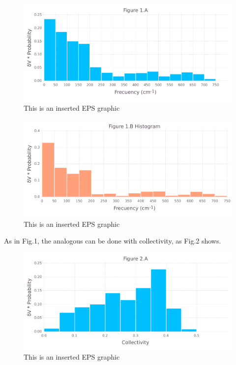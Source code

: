 \documentclass[10pt,letterpaper]{article}
\begin{document}
\begin{figure}[ht]
\begin{center}
\includegraphics[scale=0.5]{1hvr_apo/1afigure.pdf}
\caption{This is an inserted EPS graphic}
\label{fig1}
\end{center}
\end{figure}

\begin{figure}[ht]
\begin{center}
\includegraphics[scale=0.5]{1hvr_apo/1bfigure.pdf}
\caption{This is an inserted EPS graphic}
\label{fig2}
\end{center}
\end{figure}

\clearpage
As in Fig.1, the analogous can be done with collectivity, as Fig.2 shows. 

\begin{figure}[ht]
\begin{center}
\includegraphics[scale=0.5]{1hvr_apo/2afigure.pdf}
\caption{This is an inserted EPS graphic}
\label{fig3}
\end{center}
\end{figure}
\end{document}
